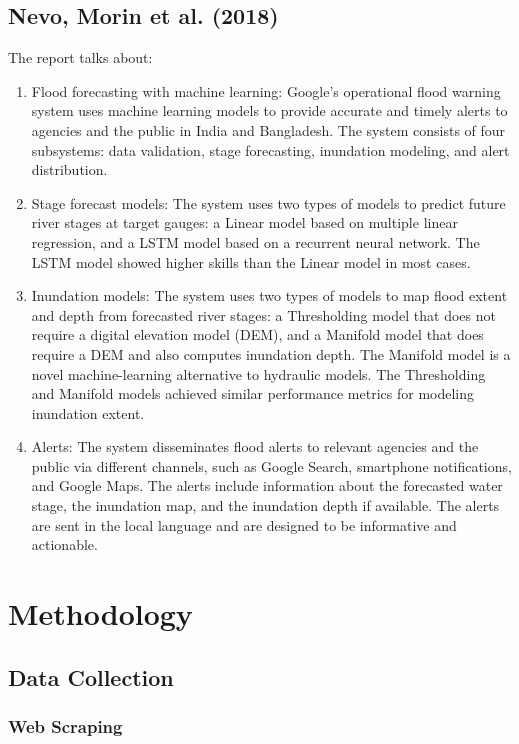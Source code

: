 \documentclass[a4paper,12pt]{report}
\begin{document}
\section{Nevo, Morin et al. (2018)}
The report talks about:
\begin{enumerate}
\item Flood forecasting with machine learning: Google's operational flood warning system uses machine learning models to provide accurate and timely alerts to agencies and the public in India and Bangladesh. The system consists of four subsystems: data validation, stage forecasting, inundation modeling, and alert distribution.
\item Stage forecast models: The system uses two types of models to predict future river stages at target gauges: a Linear model based on multiple linear regression, and a LSTM model based on a recurrent neural network. The LSTM model showed higher skills than the Linear model in most cases.
\item Inundation models: The system uses two types of models to map flood extent and depth from forecasted river stages: a Thresholding model that does not require a digital elevation model (DEM), and a Manifold model that does require a DEM and also computes inundation depth. The Manifold model is a novel machine-learning alternative to hydraulic models. The Thresholding and Manifold models achieved similar performance metrics for modeling inundation extent.
\item Alerts: The system disseminates flood alerts to relevant agencies and the public via different channels, such as Google Search, smartphone notifications, and Google Maps. The alerts include information about the forecasted water stage, the inundation map, and the inundation depth if available. The alerts are sent in the local language and are designed to be informative and actionable.
\end{enumerate}


\chapter{Methodology}

\section{Data Collection}

\subsection{Web Scraping}
\end{document}

